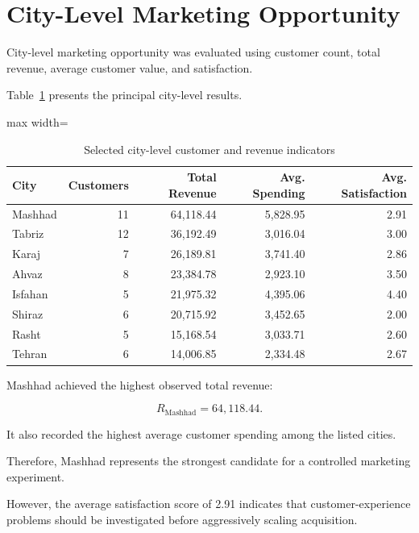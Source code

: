 \documentclass[11pt,a4paper]{article}
\begin{document}

\section{City-Level Marketing Opportunity}

City-level marketing opportunity was evaluated using customer count, total revenue, average customer value, and satisfaction.

Table~\ref{tab:city} presents the principal city-level results.

\begin{table}[H]
\centering
\caption{Selected city-level customer and revenue indicators}
\label{tab:city}
\begin{adjustbox}{max width=\textwidth}
\begin{tabular}{lrrrr}
\toprule
\textbf{City} &
\textbf{Customers} &
\textbf{Total Revenue} &
\textbf{Avg. Spending} &
\textbf{Avg. Satisfaction}\\
\midrule
Mashhad & 11 & 64,118.44 & 5,828.95 & 2.91\\
Tabriz & 12 & 36,192.49 & 3,016.04 & 3.00\\
Karaj & 7 & 26,189.81 & 3,741.40 & 2.86\\
Ahvaz & 8 & 23,384.78 & 2,923.10 & 3.50\\
Isfahan & 5 & 21,975.32 & 4,395.06 & 4.40\\
Shiraz & 6 & 20,715.92 & 3,452.65 & 2.00\\
Rasht & 5 & 15,168.54 & 3,033.71 & 2.60\\
Tehran & 6 & 14,006.85 & 2,334.48 & 2.67\\
\bottomrule
\end{tabular}
\end{adjustbox}
\end{table}

Mashhad achieved the highest observed total revenue:

\[
R_{\text{Mashhad}}=64,118.44.
\]

It also recorded the highest average customer spending among the listed cities.

Therefore, Mashhad represents the strongest candidate for a controlled marketing experiment.

However, the average satisfaction score of 2.91 indicates that customer-experience problems should be investigated before aggressively scaling acquisition.
\end{document}
